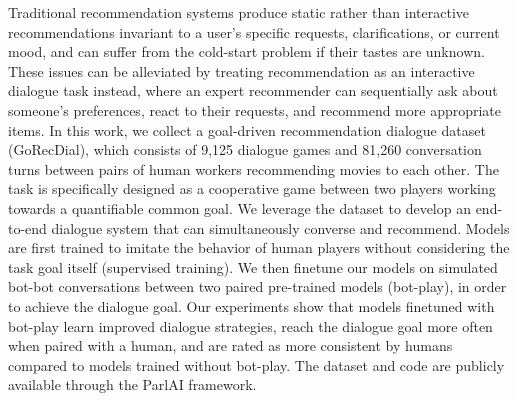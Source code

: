Traditional recommendation systems produce static rather than interactive recommendations invariant to a user's specific requests, clarifications, or current mood, and can suffer from the cold-start problem if their tastes are unknown. These issues can be alleviated by treating recommendation as an interactive dialogue task instead, where an expert recommender can sequentially ask about someone's preferences, react to their requests, and recommend more appropriate items. In this work, we collect a goal-driven recommendation dialogue dataset (GoRecDial), which consists of 9,125 dialogue games and 81,260 conversation turns between pairs of human workers recommending movies to each other. The task is specifically designed as a cooperative game between two players working towards a quantifiable common goal. We leverage the dataset to develop an end-to-end dialogue system that can simultaneously converse and recommend. Models are first trained to imitate the behavior of human players without considering the task goal itself (supervised training). We then finetune our models on simulated bot-bot conversations between two paired pre-trained models (bot-play), in order to achieve the dialogue goal. Our experiments show that models finetuned with bot-play learn improved dialogue strategies, reach the dialogue goal more often when paired with a human, and are rated as more consistent by humans compared to models trained without bot-play. The dataset and code are publicly available through the ParlAI framework.
